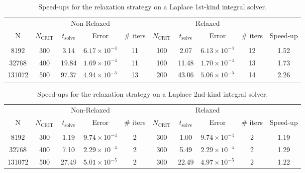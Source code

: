 \documentclass[final,3p,times]{elsarticle}
\newcommand{\ncrit}{N_{\text{CRIT}}}
\newcommand{\tsolve}{t_{\text{solve}}}
\begin{document}
\begin{table}[h]
\footnotesize
\begin{center}
\begin{tabular}{c|cccc|cccc|c}
  & \multicolumn{4}{c|}{Non-Relaxed} & \multicolumn{4}{c|}{Relaxed} &  \\
  N & $\ncrit$ & $\tsolve$ & Error & \# iters & $\ncrit$ & $\tsolve$ & Error & \# iters & Speed-up\\
 \hline
   & & & & & & & & &\\
  8192 & 300 & 3.14 & $6.17\times10^{-4}$ & 11 & 100 & 2.07 & $6.13\times10^{-4}$ & 12 & 1.52\\
  32768 & 400 & 19.84 & $1.69\times10^{-4}$ & 11 & 100 & 11.48 & $1.70\times10^{-4}$ & 13 & 1.73\\
  131072 & 500 & 97.37 & $4.94\times10^{-5}$ & 13 & 200 & 43.06 & $5.06\times10^{-5}$ & 14 & 2.26\\
 
\end{tabular}
\end{center}
\caption{Speed-ups for the relaxation strategy on a Laplace 1st-kind integral solver.}
\label{tab:laplace_1st_relaxation}
\end{table}%

\begin{table}[h]
\footnotesize
\begin{center}
\begin{tabular}{c|cccc|cccc|c}
  & \multicolumn{4}{c|}{Non-Relaxed} & \multicolumn{4}{c|}{Relaxed} &  \\
  N & $\ncrit$ & $\tsolve$ & Error & \# iters & $\ncrit$ & $\tsolve$ & Error & \# iters & Speed-up\\
 \hline
   & & & & & & & & &\\
  8192 & 300 & 1.19 & $9.74\times10^{-4}$ & 2 & 300 & 1.00 & $9.74\times10^{-4}$ & 2 & 1.19\\
  32768 & 400 & 7.10 & $2.29\times10^{-4}$ & 2 & 300 & 5.49 & $2.29\times10^{-4}$ & 2 & 1.29\\
  131072 & 500 & 27.49 & $5.01\times10^{-5}$ & 2 & 300 & 22.49 & $4.97\times10^{-5}$ & 2 & 1.22\\
 
\end{tabular}
\end{center}
\caption{Speed-ups for the relaxation strategy on a Laplace 2nd-kind integral solver.}
\label{tab:laplace_2nd_relaxation}
\end{table}%
\end{document}
